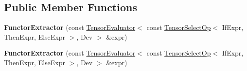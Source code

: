 \subsection*{Public Member Functions}
\begin{DoxyCompactItemize}
\item 
\mbox{\label{struct_eigen_1_1_tensor_sycl_1_1internal_1_1_functor_extractor_3_01_tensor_evaluator_3_01const_08443a240f6166215dcd0107fd174ad7c_af0bb31a1301e4e4182649c765a6df82b}} 
{\bfseries Functor\+Extractor} (const \hyperlink{struct_eigen_1_1_tensor_evaluator}{Tensor\+Evaluator}$<$ const \hyperlink{class_eigen_1_1_tensor_select_op}{Tensor\+Select\+Op}$<$ If\+Expr, Then\+Expr, Else\+Expr $>$, Dev $>$ \&expr)
\item 
\mbox{\label{struct_eigen_1_1_tensor_sycl_1_1internal_1_1_functor_extractor_3_01_tensor_evaluator_3_01const_08443a240f6166215dcd0107fd174ad7c_af0bb31a1301e4e4182649c765a6df82b}} 
{\bfseries Functor\+Extractor} (const \hyperlink{struct_eigen_1_1_tensor_evaluator}{Tensor\+Evaluator}$<$ const \hyperlink{class_eigen_1_1_tensor_select_op}{Tensor\+Select\+Op}$<$ If\+Expr, Then\+Expr, Else\+Expr $>$, Dev $>$ \&expr)
\end{DoxyCompactItemize}
